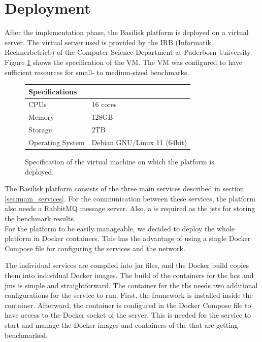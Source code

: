 \section{Deployment}
\label{sec:deployment}
After the implementation phase, the Basilisk platform is deployed on a virtual server.
The virtual server used is provided by the IRB (Informatik Rechnerbetrieb) of the Computer Science Department at Paderborn University.
Figure \ref{fig:vm_specs} shows the specification of the VM.
The VM was configured to have sufficient resources for small- to medium-sized benchmarks.

\begin{figure}[tbph]
	\centering
	\begin{tabular}{ll}
		\toprule
		\textbf{Specifications} &                             \\ \midrule
		CPUs                    & 16 cores                    \\ \midrule
		Memory                  & 128GB                       \\ \midrule
		Storage                 & 2TB                         \\ \midrule
		Operating System        & Debian GNU/Linux 11 (64bit) \\ \bottomrule
	\end{tabular}
	\caption{Specification of the virtual machine on which the platform is deployed.}
	\label{fig:vm_specs}
\end{figure}

The Basilisk platform consists of the three main services described in section \ref{sec:main_services}.
For the communication between these services, the platform also needs a RabbitMQ message server.
Also, a \ts{} is required as the \acl{jsts} for storing the benchmark results.
\\

For the platform to be easily manageable, we decided to deploy the whole platform in Docker containers.
This has the advantage of using a single Docker Compose file for configuring the services and the network.

The individual services are compiled into jar files, and the Docker build copies them into individual Docker images.
The build of the containers for the \ac{hcs} and \ac{jms} is simple and straightforward.
The container for the \ac{tbs} needs two additional configurations for the service to run.
First, the \iguana{} framework is installed inside the container.
Afterward, the container is configured in the Docker Compose file to have access to the Docker socket of the server.
This is needed for the service to start and manage the Docker images and containers of the \tsp{} that are getting benchmarked.

